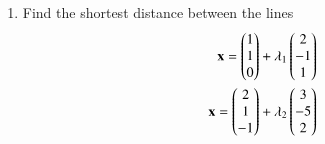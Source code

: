 \renewcommand{\theequation}{\theenumi}
\begin{enumerate}[label=\thesection.\arabic*.,ref=\thesection.\theenumi]

  
\item Find the shortest distance between the lines
\begin{align}
\mathbf{x}=\begin{pmatrix}1\\1\\0\end{pmatrix}+\lambda_1\begin{pmatrix}2\\-1\\1\end{pmatrix}\\
\mathbf{x}=\begin{pmatrix}2\\1\\-1\end{pmatrix}+\lambda_2\begin{pmatrix}3\\-5\\2\end{pmatrix}
\end{align}
\solution


\end{enumerate}
